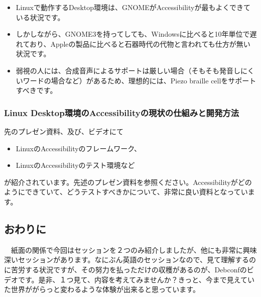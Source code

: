 \documentclass[mingoth,a4paper]{jsarticle}
\begin{document}
\begin{itemize}
  \item Linuxで動作するDesktop環境は、GNOMEがAccessibilityが最もよくできている状況です。
  \item しかしながら、GNOME3を持ってしても、Windowsに比べると10年単位で遅れており、Appleの製品に比べると石器時代の代物と言われても仕方が無い状況です。
  \item 弱視の人には、合成音声によるサポートは厳しい場合（そもそも発音しにくいワードの場合など）があるため、理想的には、Piezo braille cellをサポートすべきです。
\end{itemize}

\subsubsection{Linux Desktop環境のAccessibilityの現状の仕組みと開発方法}

先のプレゼン資料、及び、ビデオにて

\begin{itemize}
  \item LinuxのAccessibilityのフレームワーク、
  \item LinuxのAccessibilityのテスト環境など
 \end{itemize}

が紹介されています。先述のプレゼン資料を参照ください。Accessibilityがどのようにできていて、どうテストすべきかについて、非常に良い資料となっています。

\subsection{おわりに}

　紙面の関係で今回はセッションを２つのみ紹介しましたが、他にも非常に興味深いセッションがあります。なにぶん英語のセッションなので、見て理解するのに苦労する状況ですが、その努力を払っただけの収穫があるのが、Debconfのビデオです。是非、１つ見て、内容を考えてみませんか？きっと、今まで見えていた世界ががらっと変わるような体験が出来ると思っています。

\end{document}
